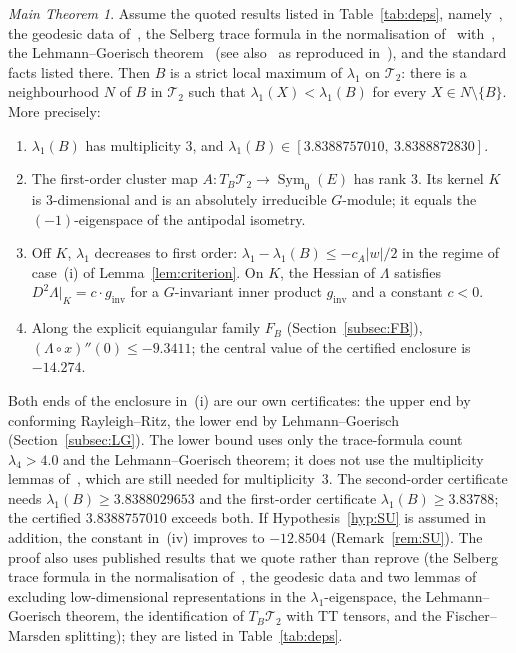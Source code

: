 \documentclass[11pt]{amsart}
\theoremstyle{definition}
\theoremstyle{remark}
\newtheorem*{maintheorem}{Main Theorem}
\newcommand{\Teich}{\mathcal{T}_2}
\newcommand{\Sym}{\operatorname{Sym}}
\newcommand{\gin}{g_{\mathrm{inv}}}
\newcommand{\FB}{F_B}
\begin{document}
\begin{maintheorem}
Assume the quoted results listed in Table~\ref{tab:deps}, namely~\cite[Lemmas~7.2--7.3]{FBP-K}, the
geodesic data of~\cite[\S7.4]{FBP-K}, the Selberg trace formula in the normalisation
of~\cite{FBP-K} with~\cite[Lemma~3.2]{FBP-K}, the Lehmann--Goerisch
theorem~\cite[Thms.~4.1, 4.3]{LiuPlum} (see also~\cite[Thm.~2.1]{BMPW} as reproduced in~\cite{Vej18}),
and the standard facts listed there. Then $B$ is a strict local maximum of $\lambda_1$ on $\Teich$:
there is a neighbourhood $N$ of $B$ in $\Teich$ such that $\lambda_1(X)<\lambda_1(B)$ for every
$X\in N\setminus\{B\}$. More precisely:
\begin{enumerate}[label=\textup{(\roman*)}]
\item $\lambda_1(B)$ has multiplicity $3$, and
$\lambda_1(B)\in[3.8388757010,\ 3.8388872830]$.
\item The first-order cluster map $A\colon T_B\Teich\to\Sym_0(E)$ has rank $3$. Its kernel $K$
is $3$-dimensional and is an absolutely irreducible $G$-module; it equals the
$(-1)$-eigenspace of the antipodal isometry.
\item Off $K$, $\lambda_1$ decreases to first order: $\lambda_1-\lambda_1(B)\le -c_A|w|/2$ in the
regime of case~(i) of Lemma~\ref{lem:criterion}. On $K$, the Hessian of $\Lambda$ satisfies
$D^2\Lambda|_K=c\cdot\gin$ for a $G$-invariant inner product $\gin$ and a constant $c<0$.
\item Along the explicit equiangular family $\FB$ (Section~\ref{subsec:FB}),
$(\Lambda\circ x)''(0)\le -9.3411$; the central value of the certified enclosure is $-14.274$.
\end{enumerate}
\end{maintheorem}

Both ends of the enclosure in~(i) are our own certificates: the upper end by conforming
Rayleigh--Ritz, the lower end by Lehmann--Goerisch (Section~\ref{subsec:LG}). The lower bound uses
only the trace-formula count $\lambda_4>4.0$ and the Lehmann--Goerisch theorem; it does not use
the multiplicity lemmas of~\cite{FBP-K}, which are still needed for multiplicity~$3$. The second-order
certificate needs $\lambda_1(B)\ge 3.8388029653$ and the first-order certificate
$\lambda_1(B)\ge3.83788$; the certified $3.8388757010$ exceeds both. If
Hypothesis~\ref{hyp:SU} is assumed in addition, the constant in~(iv) improves to $-12.8504$
(Remark~\ref{rem:SU}). The proof also uses published results that we quote rather than reprove
(the Selberg trace formula in the normalisation of~\cite{FBP-K}, the geodesic data and two lemmas
of~\cite{FBP-K} excluding low-dimensional representations in the $\lambda_1$-eigenspace, the
Lehmann--Goerisch theorem, the identification of $T_B\Teich$ with TT tensors, and the
Fischer--Marsden splitting); they are listed in Table~\ref{tab:deps}.
\end{document}
